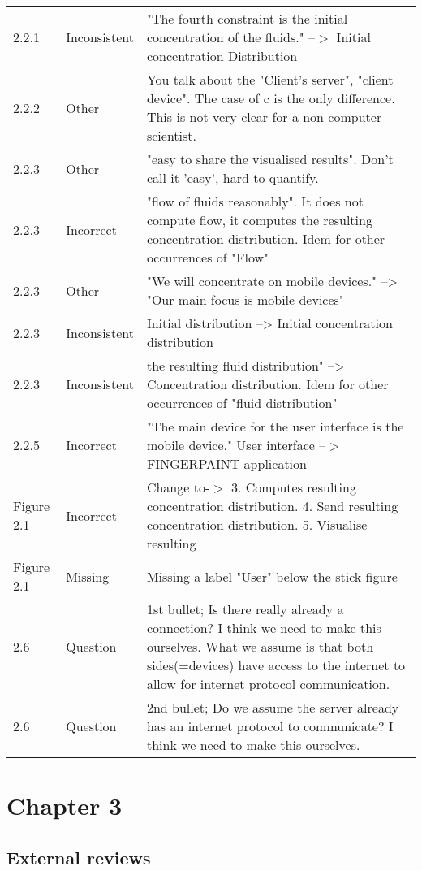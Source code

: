 \begin{longtable}{l|l|p{}}
2.2.1 & Inconsistent & "The fourth constraint is the initial concentration of the  fluids." --$>$ Initial concentration Distribution \\
2.2.2 & Other & You talk about the "Client's server", "client device". The case of c is the only difference. This is not very clear for a non-computer scientist.\\
2.2.3 & Other & "easy to share the visualised results". Don't call it 'easy', hard to quantify.\\
2.2.3 & Incorrect & "flow of fluids reasonably". It does not compute flow, it computes the resulting concentration distribution. Idem for other occurrences of "Flow"\\
2.2.3 & Other & "We will concentrate on mobile devices." --> "Our main focus is mobile devices"\\
2.2.3 & Inconsistent & Initial distribution --> Initial concentration distribution\\
2.2.3 & Inconsistent & the resulting fluid distribution" --> Concentration distribution. Idem for other occurrences of "fluid distribution"\\
2.2.5 & Incorrect & "The main device for the user interface is the mobile device." User interface --$>$ FINGERPAINT application\\
Figure 2.1 & Incorrect & Change to-$>$ 3. Computes resulting concentration distribution. 4. Send resulting concentration distribution. 5. Visualise resulting\\
Figure 2.1 & Missing & Missing a label "User" below the stick figure\\
2.6 & Question & 1st bullet; Is there really already a connection? I think we need to make this ourselves. What we assume is that both sides(=devices) have access to the internet to allow for internet protocol communication.\\
2.6 & Question & 2nd bullet; Do we assume the server already has an internet protocol to communicate? I think we need to make this ourselves.\\
\end{longtable}

\section{Chapter 3}
\subsection{External reviews}
